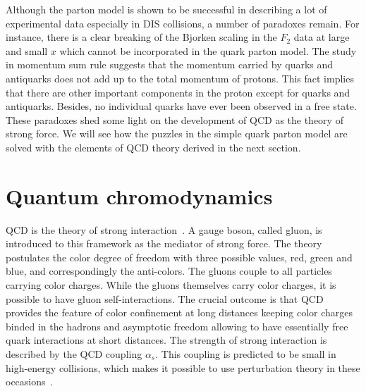 Although the parton model is shown to be successful in describing a lot of
experimental data especially in DIS collisions, a number of paradoxes remain.
For instance, there is a clear breaking of the Bjorken scaling in the $F_{2}$
data at large and small $x$ which cannot be incorporated in the quark parton
model. The study in momentum sum rule suggests that the momentum carried by
quarks and antiquarks does not add up to the total momentum of protons. This fact
implies that there are other important components in the proton except for
quarks and antiquarks. Besides, no individual quarks have ever been observed in a free
state. These paradoxes shed some light on the development of QCD as the theory
of strong force. We will see how the puzzles in the simple quark parton model
are solved with the elements of QCD theory derived in the next section.




\section{Quantum chromodynamics} \label{sec:QCD}
QCD is the theory of strong interaction~\cite{Politzer:1974fr}. A gauge
boson, called gluon, is introduced to this framework as the mediator of strong
force. The theory postulates the color degree of freedom with three possible
values, red, green and blue, and correspondingly the anti-colors. The gluons
couple to all particles carrying color charges. While the gluons themselves
carry color charges, it is possible to have gluon self-interactions. The crucial
outcome is that QCD provides the feature of color confinement at long distances
keeping color charges binded in the hadrons and asymptotic freedom allowing to
have essentially free quark interactions at short distances. The strength of
strong interaction is described by the QCD coupling $\alpha_{s}$. This coupling
is predicted to be small in high-energy collisions, which makes it possible to
use perturbation theory in these occasions~\cite{Lipatov:1974qm}.


